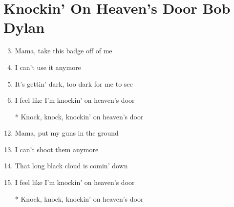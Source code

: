 \documentclass{article}
\begin{document}
    
    \section*{Knockin' On Heaven's Door \by Bob Dylan}
    \begin{enumerate}
 
        \item[]
        \item[] 
        \item Mama, take this badge off of me
        \item I can't use it anymore
        \item It's gettin' dark, too dark for me to see
        \item I feel like I'm knockin' on heaven's door
        
        \item[]
        \item[] 
        \item[*] Knock, knock, knockin' on heaven's door
        
        \item[]
        \item[] 
        \item Mama, put my guns in the ground
        \item I can't shoot them anymore
        \item That long black cloud is comin' down
        \item I feel like I'm knockin' on heaven's door
        
        \item[]
        \item[] 
        \item[*] Knock, knock, knockin' on heaven's door
 
    \end{enumerate}
\end{document}
